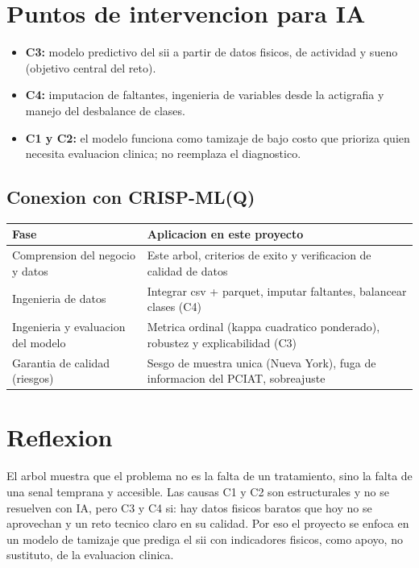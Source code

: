 \documentclass[10pt,letterpaper]{article}
\begin{document}
\section{Puntos de intervencion para IA}
\begin{itemize}
  \item \textbf{C3:} modelo predictivo del sii a partir de datos fisicos, de actividad y sueno (objetivo central del reto).
  \item \textbf{C4:} imputacion de faltantes, ingenieria de variables desde la actigrafia y manejo del desbalance de clases.
  \item \textbf{C1 y C2:} el modelo funciona como tamizaje de bajo costo que prioriza quien necesita evaluacion clinica; no reemplaza el diagnostico.
\end{itemize}
 
\subsection*{Conexion con CRISP-ML(Q)}
\begin{center}
\small
\begin{tabularx}{\linewidth}{>{\raggedright\arraybackslash}p{4.6cm} X}
\toprule
\textbf{Fase} & \textbf{Aplicacion en este proyecto} \\
\midrule
Comprension del negocio y datos & Este arbol, criterios de exito y verificacion de calidad de datos \\
Ingenieria de datos & Integrar csv + parquet, imputar faltantes, balancear clases (C4) \\
Ingenieria y evaluacion del modelo & Metrica ordinal (kappa cuadratico ponderado), robustez y explicabilidad (C3) \\
Garantia de calidad (riesgos) & Sesgo de muestra unica (Nueva York), fuga de informacion del PCIAT, sobreajuste \\
\bottomrule
\end{tabularx}
\end{center}
 
\section{Reflexion}
El arbol muestra que el problema no es la falta de un tratamiento, sino la falta de una senal
temprana y accesible. Las causas C1 y C2 son estructurales y no se resuelven con IA, pero C3 y C4
si: hay datos fisicos baratos que hoy no se aprovechan y un reto tecnico claro en su calidad.
Por eso el proyecto se enfoca en un modelo de tamizaje que prediga el sii con indicadores
fisicos, como apoyo, no sustituto, de la evaluacion clinica.
 
\end{document}
